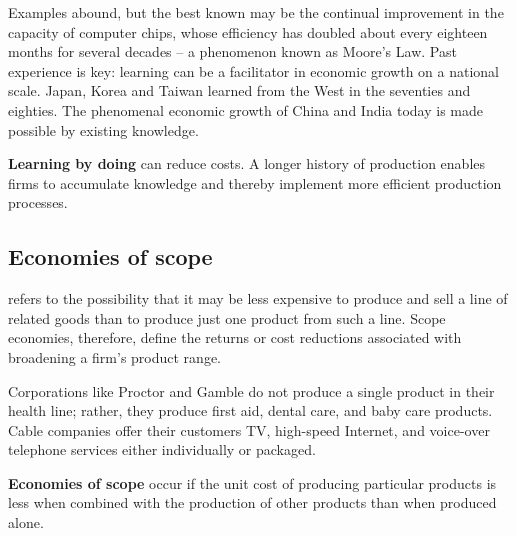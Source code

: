 Examples abound, but the best known may be the continual improvement in the capacity of computer chips, whose efficiency has doubled about every eighteen months for several decades -- a phenomenon known as Moore's Law. Past experience is key: learning can be a facilitator in economic growth on a national scale. Japan, Korea and Taiwan learned from the West in the seventies and eighties. The phenomenal economic growth of China and India today is made possible by existing knowledge.

\begin{DefBox}
\textbf{Learning by doing} can reduce costs. A longer history of production enables firms to accumulate knowledge and thereby implement more efficient production processes.
\end{DefBox}

\subsection*{Economies of scope}

 refers to the possibility that it may be less expensive to produce and sell a line of related goods than to produce just one product from such a line. Scope economies, therefore, define the returns or cost reductions associated with broadening a firm's product range. 

Corporations like Proctor and Gamble do not produce a single product in their health line; rather, they produce first aid, dental care, and baby care products. Cable companies offer their customers TV, high-speed Internet, and voice-over telephone services either individually or packaged.

\begin{DefBox}
\textbf{Economies of scope} occur if the unit cost of producing particular products is less when combined with the production of other products than when produced alone.
\end{DefBox}
